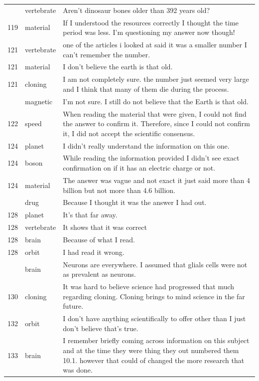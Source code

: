 \documentclass[
  doc,floatsintext]{apa6}
\begin{document}
\begin{longtable}[t]{>{}r>{}l>{\raggedright\arraybackslash}p{30em}}
\addlinespace
118 & vertebrate & Aren't dinosaur bones older than 392 years old?\\
119 & material & If I understood the resources correctly I thought the time period was less. I'm questioning my answer now though!\\
121 & vertebrate & one of the articles i looked at said it was a smaller number I can't remember the number.\\
121 & material & I don't believe the earth is that old.\\
121 & cloning & I am not completely sure.  the number just seemed very large and I think that many of them die during the process.\\
\addlinespace
121 & magnetic & I'm not sure.  I still do not believe that the Earth is that old.\\
122 & speed & When reading the material that were given, I could not find the answer to confirm it. Therefore, since I could not confirm it, I did not accept the scientific consensus.\\
124 & planet & I didn't really understand the information on this one.\\
124 & boson & While reading the information provided I didn't see exact confirmation on if it has an electric charge or not.\\
124 & material & The answer was vague and not exact it just said more than 4 billion but not more than 4.6 billion.\\
\addlinespace
128 & drug & Because I thought it was the answer I had out.\\
128 & planet & It’s that far away.\\
128 & vertebrate & It shows that it was correct\\
128 & brain & Because of what I read.\\
128 & orbit & I had read it wrong.\\
\addlinespace
130 & brain & Neurons are everywhere.  I assumed that glials cells were not as prevalent as neurons.\\
130 & cloning & It was hard to believe science had progressed that much regarding cloning.  Cloning brings to mind science in the far future.\\
132 & orbit & I don't have anything scientifically to offer other than I just don't believe that's true.\\
133 & brain & I remember briefly coming across information on this subject and at the time they were thing they out numbered them 10.1. however that could of changed the more research that was done.\\

\end{longtable}
\end{document}

